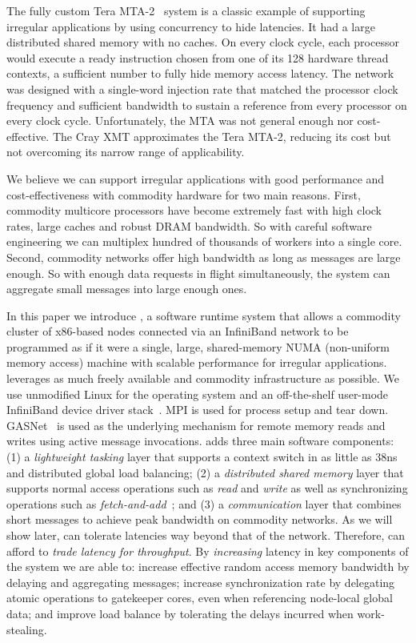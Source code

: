 The fully custom Tera MTA-2~\cite{tera:mta1} system is a classic example of
supporting irregular applications by using concurrency to hide latencies. It
had a large distributed shared memory with no caches. On every clock cycle,
each processor would execute a ready instruction chosen from one of its 128
hardware thread contexts, a sufficient number to fully hide memory access
latency. The network was designed with a single-word injection rate that
matched the processor clock frequency and sufficient bandwidth to sustain a
reference from every processor on every clock cycle. Unfortunately, the MTA
was not general enough nor cost-effective. The Cray XMT approximates the Tera
MTA-2, reducing its cost but not overcoming its narrow range of applicability.

We believe we can support irregular applications with good performance and cost-effectiveness with commodity hardware for two main reasons. First, commodity multicore processors have become extremely fast with high clock rates, large caches and robust DRAM bandwidth. So with careful software engineering we can multiplex hundred of thousands of workers into a single core. Second, commodity networks offer high bandwidth as long as messages are large enough. So with enough data requests in flight simultaneously, the system can aggregate small messages into large enough ones.

In this paper we introduce \Grappa, a software runtime system that allows a commodity cluster of x86-based nodes connected via an InfiniBand network to be programmed as if it were a single, large, shared-memory NUMA (non-uniform memory access) machine with scalable performance for irregular applications. \Grappa leverages as much freely available and commodity infrastructure as possible. We use unmodified Linux for the operating system and an off-the-shelf user-mode InfiniBand device driver stack~\cite{OFED}. MPI is used for process setup and tear down. GASNet~\cite{gasnet} is used as the underlying mechanism for remote memory reads and writes using active message invocations. \Grappa adds three main software components: (1) a \emph{lightweight tasking\/} layer that supports a context switch in as little as 38ns and distributed global load balancing; (2) a \emph{distributed shared memory\/} layer that supports normal access operations such as \emph{read\/} and \emph{write\/} as well as synchronizing operations such as \emph{fetch-and-add\/}~\cite{fetchandadd}; and (3) a \emph{communication\/} layer that combines short messages to achieve peak bandwidth on commodity networks. As we will show later, \Grappa can tolerate latencies way beyond that of the network. Therefore, \Grappa can afford to \emph{trade latency for throughput}. By {\em increasing\/} latency in key components of the system we are able to: increase effective random access memory bandwidth by delaying and aggregating messages; increase synchronization rate by delegating atomic operations to gatekeeper cores, even when referencing node-local global data; and improve load balance by tolerating the delays incurred when work-stealing.

